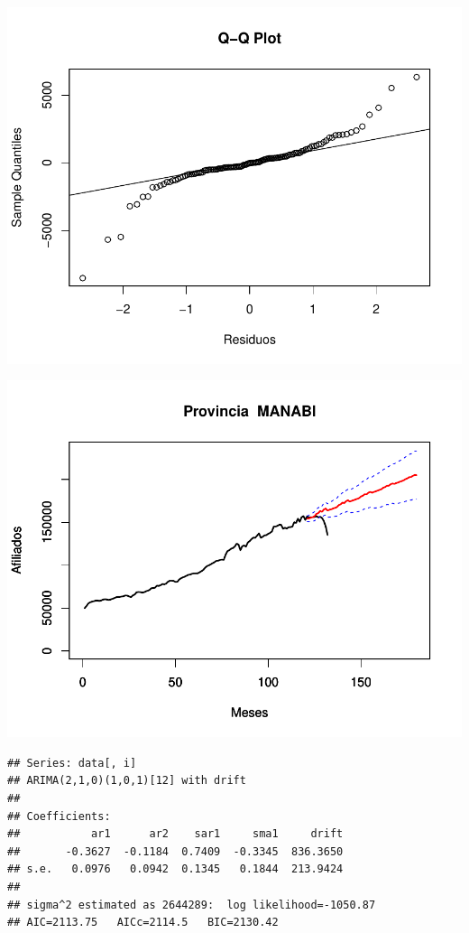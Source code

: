 \documentclass[11pt,a4paper,oneside]{article}\usepackage[]{graphicx}\usepackage[]{color}
\makeatletter
\def\maxwidth{ %
  \ifdim\Gin@nat@width>\linewidth
    \linewidth
  \else
    \Gin@nat@width
  \fi
}
\newenvironment{kframe}{%
 \def\at@end@of@kframe{}%
 \ifinner\ifhmode%
  \def\at@end@of@kframe{\end{minipage}}%
  \begin{minipage}{\columnwidth}%
 \fi\fi%
 \def\FrameCommand##1{\hskip\@totalleftmargin \hskip-\fboxsep
 \colorbox{shadecolor}{##1}\hskip-\fboxsep
     \hskip-\linewidth \hskip-\@totalleftmargin \hskip\columnwidth}%
 \MakeFramed {\advance\hsize-\width
   \@totalleftmargin\z@ \linewidth\hsize
   \@setminipage}}%
 {\par\unskip\endMakeFramed%
 \at@end@of@kframe}
\newenvironment{knitrout}{}{} %
\makeatother
\begin{document}
\begin{knitrout}
{}




{\centering \includegraphics[width=\maxwidth]{figure/unnamed-chunk-16-39} 

}




{\centering \includegraphics[width=\maxwidth]{figure/unnamed-chunk-16-40} 

}


\begin{kframe}\begin{verbatim}
## Series: data[, i] 
## ARIMA(2,1,0)(1,0,1)[12] with drift         
## 
## Coefficients:
##           ar1      ar2    sar1     sma1     drift
##       -0.3627  -0.1184  0.7409  -0.3345  836.3650
## s.e.   0.0976   0.0942  0.1345   0.1844  213.9424
## 
## sigma^2 estimated as 2644289:  log likelihood=-1050.87
## AIC=2113.75   AICc=2114.5   BIC=2130.42
\end{verbatim}
\end{kframe}


\end{knitrout}
\end{document}
